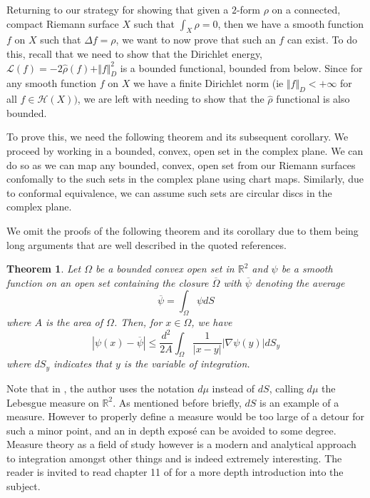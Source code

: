 \documentclass[11pt]{report}
\newtheorem{thm}{Theorem}[section]
\theoremstyle{definition}
\begin{document}
Returning to our strategy for showing that given a $2$-form $\rho$ on a connected, compact Riemann surface $X$ such that $\int_X \rho = 0$, then we have a smooth function $f$ on $X$ such that $\Delta f = \rho$, we want to now prove that such an $f$ can exist. To do this, recall that we need to show that the Dirichlet energy, $\mathcal{L}(f) = -2\hat{\rho}(f) + \Vert f \Vert^2_D$ is a bounded functional, bounded from below. Since for any smooth function $f$ on $X$ we have a finite Dirichlet norm (ie $\Vert f \Vert_D < +\infty $ for all $f \in \mathcal{H}(X))$, %
we are left with needing to show that the $\hat{\rho}$ functional is also bounded.

To prove this, we need the following theorem and its subsequent corollary. We proceed by working in a bounded, convex, open set in the complex plane. We can do so as we can map any bounded, convex, open set from our Riemann surfaces confomally to the such sets in the complex plane using chart maps. Similarly, due to conformal equivalence, we can assume such sets are circular discs in the complex plane.

We omit the proofs of the following theorem and its corollary due to them being long arguments that are well described in the quoted references.
\begin{thm}\cite[(p122. Theorem 11)]{donaldson}\label{quotedTheorem11}
  Let $\Omega$ be a bounded convex open set in $\mathbb{R}^2$ and $\psi$ be a smooth function on an open set containing the closure $\overline{\Omega}$ with $\overline{\psi}$ denoting the average 
  \[\overline{\psi} = \int_{\Omega}\psi dS\] 
  where $A$ is the area of $\Omega$. Then, for $x \in \Omega$, we have 
  \[|\psi(x) - \overline{\psi}| \leq \frac{d^2}{2A}\int_\Omega \frac{1}{|x - y|}|\nabla\psi(y)|dS_y\] where $dS_y$ indicates that $y$ is the variable of integration.
\end{thm}
Note that in \cite{donaldson}, the author uses the notation $d\mu$ instead of $dS$, calling $d\mu$ the Lebesgue measure on $\mathbb{R}^2$. As mentioned before briefly, $dS$ is an example of a measure. However to properly define a measure would be too large of a detour for such a minor point, and an in depth expos\'{e} can be avoided to some degree. Measure theory as a field of study however is a modern and analytical approach to integration amongst other things and is indeed extremely interesting. The reader is invited to read chapter 11 of \cite{babyRudin} for a more depth introduction into the subject.
\end{document}

